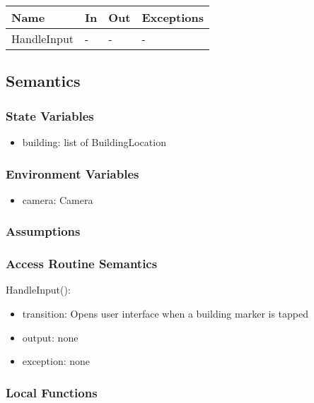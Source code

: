 \documentclass[12pt, titlepage]{article}
\begin{document}
\begin{center}
\begin{tabular}{p{2cm} p{4cm} p{4cm} p{2cm}}
\hline
\textbf{Name} & \textbf{In} & \textbf{Out} & \textbf{Exceptions} \\
\hline
HandleInput & - & - & - \\

\hline
\end{tabular}
\end{center}

\subsection{Semantics}

\subsubsection{State Variables}

\begin{itemize}
\item building: list of BuildingLocation
\end{itemize}

\subsubsection{Environment Variables}
\begin{itemize}
\item camera: Camera
\end{itemize}
  

\subsubsection{Assumptions}

\subsubsection{Access Routine Semantics}

\noindent HandleInput():
\begin{itemize}
\item transition: Opens user interface when a building marker is tapped
\item output: none
\item exception: none
\end{itemize}

\subsubsection{Local Functions}
\end{document}
